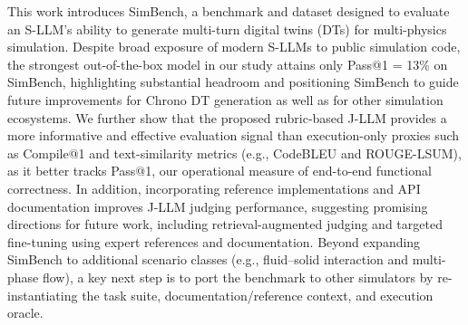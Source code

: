 



This work introduces SimBench, a benchmark and dataset designed to evaluate an S-LLM's ability to generate multi-turn digital twins (DTs) for multi-physics simulation. Despite broad exposure of modern S-LLMs to public simulation code, the strongest out-of-the-box model in our study attains only Pass@1 = 13\% on SimBench, highlighting substantial headroom and positioning SimBench to guide future improvements for Chrono DT generation as well as for other simulation ecosystems. We further show that the proposed rubric-based J-LLM provides a more informative and effective evaluation signal than execution-only proxies such as Compile@1 and text-similarity metrics (e.g., CodeBLEU and ROUGE-LSUM), as it better tracks Pass@1, our operational measure of end-to-end functional correctness. In addition, incorporating reference implementations and API documentation improves J-LLM judging performance, suggesting promising directions for future work, including retrieval-augmented judging and targeted fine-tuning using expert references and documentation. Beyond expanding SimBench to additional scenario classes (e.g., fluid--solid interaction and multi-phase flow), a key next step is to port the benchmark to other simulators by re-instantiating the task suite, documentation/reference context, and execution oracle.

\FloatBarrier